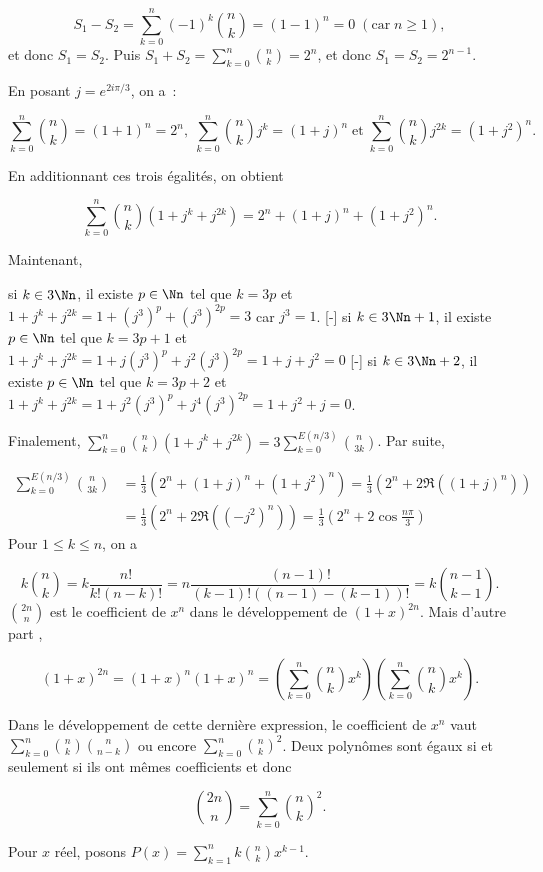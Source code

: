 {\begin{enumerate}
{$$S_1-S_2=\sum_{k=0}^{n}(-1)^k\binom{n}{k}=(1-1)^n=0\;(\mbox{car}\;n\geq1),$$
et donc $S_1=S_2$. Puis $S_1+S_2=\sum_{k=0}^{n}\binom{n}{k}=2^n$, et donc $S_1=S_2=2^{n-1}$.
\begin{center}
\end{center}
En posant $j=e^{2i\pi/3}$, on a~:

$$\sum_{k=0}^{n}\binom{n}{k}=(1+1)^n=2^n,\;\sum_{k=0}^{n}\binom{n}{k}j^k=(1+j)^n\;\mbox{et}\;\sum_{k=0}^{n}\binom{n}{k}j^{2k}
=(1+j^2)^n.$$

En additionnant ces trois égalités, on obtient

$$\sum_{k=0}^{n}\binom{n}{k}(1+j^k+j^{2k})=2^n+(1+j)^n+(1+j^2)^n.$$

Maintenant,
\begin{itemize}
[-] si $k\in3\Nn$, il existe $p\in\Nn$ tel que $k=3p$ et $1+j^k+j^{2k}=1+(j^3)^p+(j^3)^{2p}=3$ car $j^3=1$.
[-] si $k\in3\Nn+1$, il existe $p\in\Nn$ tel que $k=3p+1$ et $1+j^k+j^{2k}=1+j(j^3)^p+j^2(j^3)^{2p}=1+j+j^2=0$
[-] si $k\in3\Nn+2$, il existe $p\in\Nn$ tel que $k=3p+2$ et
$1+j^k+j^{2k}=1+j^2(j^3)^p+j^4(j^3)^{2p}=1+j^2+j=0$.
\end{itemize}

Finalement, $\sum_{k=0}^{n}\binom{n}{k}(1+j^k+j^{2k})=3\sum_{k=0}^{E(n/3)}\binom{n}{3k}$. Par suite,

\begin{align*}
\sum_{k=0}^{E(n/3)}\binom{n}{3k}&=\frac{1}{3}(2^n+(1+j)^n+(1+j^2)^n)=\frac{1}{3}(2^n+2\Re((1+j)^n))\\
 &=\frac{1}{3}(2^n+2\Re((-j^2)^n))=\frac{1}{3}(2^n+2\cos\frac{n\pi}{3})
\end{align*}
Pour $1\leq k\leq n$, on a

$$k\binom{n}{k}=k\frac{n!}{k!(n-k)!}=n\frac{(n-1)!}{(k-1)!((n-1)-(k-1))!}=k\binom{n-1}{k-1}.$$
$\binom{2n}{n}$ est le coefficient de $x^n$ dans le développement de $(1+x)^{2n}$. Mais d'autre part ,

$$(1+x)^{2n}=(1+x)^n(1+x)^n=(\sum_{k=0}^{n}\binom{n}{k}x^k)(\sum_{k=0}^{n}\binom{n}{k}x^k).$$

Dans le développement de cette dernière expression, le coefficient de $x^n$ vaut $\sum_{k=0}^{n}\binom{n}{k}\binom{n}{n-k}$ ou
encore $\sum_{k=0}^{n}\binom{n}{k}^2$. Deux polynômes sont égaux si et seulement si ils ont mêmes
coefficients et donc

$$\binom{2n}{n}=\sum_{k=0}^{n}\binom{n}{k}^2.$$
\begin{itemize}
 Pour $x$ réel, posons $P(x)=\sum_{k=1}^{n}k\binom{n}{k}x^{k-1}$.


\end{itemize}}
\end{enumerate}}
